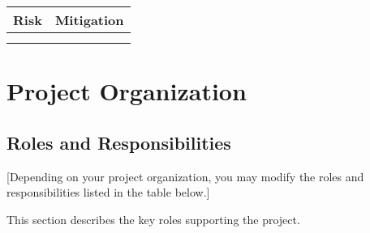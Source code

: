 \documentclass[a4paper, 11pt]{article}
\begin{document}
\begin{longtable}[]{@{}ll@{}}
\toprule
\textbf{Risk} & \textbf{Mitigation}\tabularnewline
\midrule
\endhead
&\tabularnewline
&\tabularnewline
\bottomrule
\end{longtable}

\hypertarget{project-organization}{%
\section{Project Organization}\label{project-organization}}

\hypertarget{roles-and-responsibilities}{%
\subsection{Roles and
Responsibilities}\label{roles-and-responsibilities}}

{[}Depending on your project organization, you may modify the roles and
responsibilities listed in the table below.{]}

This section describes the key roles supporting the project.
\end{document}
